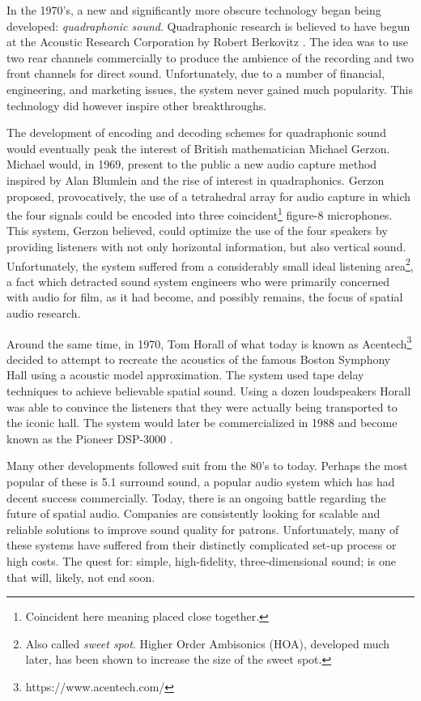 In the 1970's, a new and significantly more obscure technology began being developed: \textit{quadraphonic sound}. Quadraphonic research is believed to have begun at the Acoustic Research Corporation by Robert Berkovitz \cite{davis2003history}. The idea was to use two rear channels commercially to produce the ambience of the recording and two front channels for direct sound. Unfortunately, due to a number of financial, engineering, and marketing issues, the system never gained much popularity. This technology did however inspire other breakthroughs.

The development of encoding and decoding schemes for quadraphonic sound would eventually peak the interest of British mathematician Michael Gerzon. Michael would, in 1969, present to the public a new audio capture method inspired by Alan Blumlein and the rise of interest in quadraphonics. Gerzon proposed, provocatively, the use of a tetrahedral array for audio capture in which the four signals could be encoded into three coincident\footnote{Coincident here meaning placed close together.} figure-8 microphones. This system, Gerzon believed, could optimize the use of the four speakers by providing listeners with not only horizontal information, but also vertical sound. Unfortunately, the system suffered from a considerably small ideal listening area\footnote{Also called \textit{sweet spot}. Higher Order Ambisonics (HOA), developed much later, has been shown to increase the size of the sweet spot.}, a fact which detracted sound system engineers who were primarily concerned with audio for film, as it had become, and possibly remains, the focus of spatial audio research. 

Around the same time, in 1970, Tom Horall of what today is known as Acentech\footnote{https://www.acentech.com/} decided to attempt to recreate the acoustics of the famous Boston Symphony Hall using a acoustic model approximation. The system used tape delay techniques to achieve believable spatial sound. Using a dozen loudspeakers Horall was able to convince the listeners that they were actually being transported to the iconic hall. The system would later be commercialized in 1988 and become known as the Pioneer DSP-3000 \cite{davis2003history}. 

Many other developments followed suit from the 80's to today. Perhaps the most popular of these is 5.1 surround sound, a popular audio system which has had decent success commercially. Today, there is an ongoing battle regarding the future of spatial audio. Companies are consistently looking for scalable and reliable solutions to improve sound quality for patrons. Unfortunately, many of these systems have suffered from their distinctly complicated set-up process or high costs. The quest for: simple, high-fidelity, three-dimensional sound; is one that will, likely, not end soon. 

